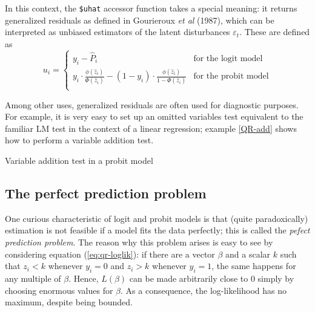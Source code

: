In this context, the \verb+$uhat+ accessor function takes a
special meaning: it returns generalized residuals as defined in
Gourieroux \textit{et al} (1987), which can be interpreted as unbiased
estimators of the latent disturbances $\varepsilon_t$. These are
defined as
%
\begin{equation}
  \label{eq:QR-genres}
  u_i = \left\{
    \begin{array}{ll}
      y_i - \hat{P}_i & \textrm{for the logit model} \\
      y_i\cdot \frac{\phi(\hat{z}_i)}{\Phi(\hat{z}_i)} - 
      ( 1 - y_i ) \cdot \frac{\phi(\hat{z}_i)}{1 - \Phi(\hat{z}_i)}
      & \textrm{for the probit model} \\
    \end{array}
    \right.
\end{equation}

Among other uses, generalized residuals are often used for diagnostic
purposes.  For example, it is very easy to set up an omitted variables
test equivalent to the familiar LM test in the context of a linear
regression; example \ref{QR-add} shows how to perform a variable
addition test.

\begin{script}[htbp]
  \caption{Variable addition test in a probit model}
  \label{QR-add}
\end{script}

\subsection{The perfect prediction problem}
\label{sec:perfpred}

One curious characteristic of logit and probit models is that (quite
paradoxically) estimation is not feasible if a model fits the data
perfectly; this is called the \emph{pefect prediction problem}. The
reason why this problem arises is easy to see by considering equation
(\ref{eq:qr-loglik}): if there are a vector $\beta$ and a scalar $k$
such that $z_i < k$ whenever $y_i=0$ and $z_i > k$ whenever $y_i=1$,
the same happens for any multiple of $\beta$. Hence, $L(\beta)$ can be
made arbitrarily close to 0 simply by choosing enormous values for
$\beta$. As a consequence, the log-likelihood has no maximum, despite
being bounded.

